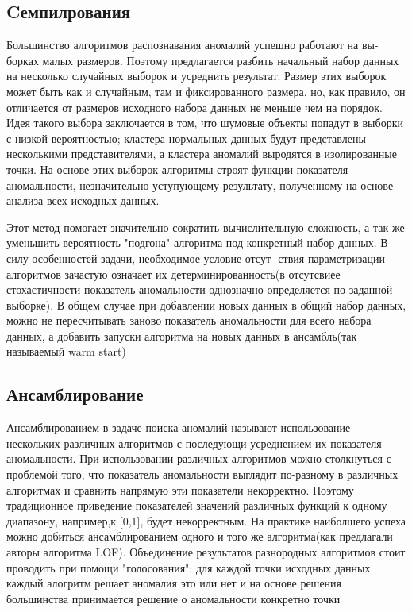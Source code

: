 \subsection{Cемпилрования}
Большинство алгоритмов распознавания аномалий успешно работают на вы-
борках малых размеров. Поэтому предлагается разбить начальный набор данных на несколько случайных выборок и усреднить результат. Размер этих выборок может быть как и случайным, там и фиксированного размера, но, как правило, он отличается от размеров исходного набора данных не меньше чем на порядок. Идея такого выбора заключается в том, что шумовые объекты попадут в выборки с низкой вероятностью; кластера нормальных данных будут представлены несколькими представителями, а кластера аномалий выродятся в изолированные точки. На основе этих выборок алгоритмы строят функции показателя аномальности, незначительно уступующему результату, полученному на основе анализа всех исходных данных. 

Этот метод помогает значительно сократить вычислительную сложность, а так же уменьшить вероятность "подгона" алгоритма под конкретный набор данных.  В силу особенностей задачи, необходимое условие отсут-
ствия параметризации алгоритмов зачастую означает их детерминированность(в отсутсвиее стохастичности показатель аномальности однозначно определяется по  заданной выборке). В общем случае при добавлении новых данных в общий набор данных, можно не пересчитывать заново показатель аномальности для всего набора данных, а добавить запуски алгоритма на новых данных в ансамбль(так называемый warm start\cite{Book15})
\subsection{Ансамблирование}
Ансамблированием в задаче поиска аномалий называют использование нескольких различных алгоритмов с последующи усреднением их показателя аномальности. При использовании различных алгоритмов можно столкнуться с проблемой того, что показатель аномальности выглядит по-разному в различных алгоритмах и сравнить напрямую эти показатели некорректно.  Поэтому традиционное приведение  показателей значений различных функций к одному диапазону, например,к [0,1], будет некорректным.
На практике  наиболшего успеха можно добиться ансамблированием одного и того же алгоритма(как предлагали авторы алгоритма LOF). Объединение результатов разнородных алгоритмов стоит проводить при помощи "голосования": для каждой точки исходных данных каждый алогритм решает аномалия это или нет и на основе решения большинства принимается решение о аномальности конкретно точки
